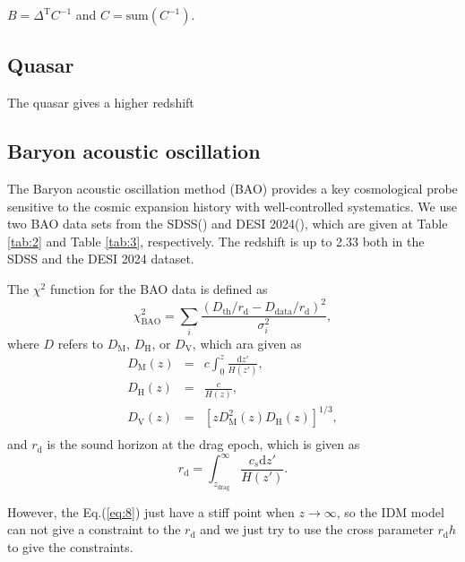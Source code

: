 \documentclass{aa}
\begin{document}
   $B=\Delta^{\text{T}}C^{-1}$ and $C=\text{sum}(C^{-1})$.

\subsection{Quasar}

   The quasar gives a higher redshift

\subsection{Baryon acoustic oscillation}

   The Baryon acoustic oscillation method (BAO) provides a key cosmological probe
   sensitive to the cosmic expansion history with well-controlled systematics.
   We use two BAO data sets from the SDSS(\cite{PhysRevD.103.083533}) and DESI 2024(\cite{desicollaboration2024desi2024vicosmological}),
   which are given at Table \ref{tab:2} and Table \ref{tab:3}, respectively.
   The redshift is up to 2.33 both in the SDSS and the DESI 2024 dataset.

   The $\chi^2$ function for the BAO data is defined as
   \begin{equation}
      \chi_{\text{BAO}}^2=\sum_i\frac{(D_{\text{th}}/r_{\text{d}}-D_{\text{data}}/r_{\text{d}})^2}{\sigma_i^2},
   \end{equation}
   where $D$ refers to $D_{\text{M}}$, $D_{\text{H}}$, or $D_{\text{V}}$, which ara given as
   \begin{eqnarray}
      D_{\text{M}}(z)&=&c\int_0^z\frac{\text{d}z'}{H(z')},\\
      D_{\text{H}}(z)&=&\frac{c}{H(z)},\\
      D_{\text{V}}(z)&=&\left[zD_{\text{M}}^2(z)D_{\text{H}}(z)\right]^{1/3},\\
   \end{eqnarray}
   and $r_{\text{d}}$ is the sound horizon at the drag epoch, which is given as
   \begin{equation}
      r_{\text{d}}=\int_{z_{\text{drag}}}^{\infty}\frac{c_s\text{d}z'}{H(z')}.
   \end{equation}

   However, the Eq.(\ref{eq:8}) just have a stiff point when $z\to\infty$, so the IDM
   model can not give a constraint to the $r_{\text{d}}$ and we just try to use the cross
   parameter $r_{\text{d}}h$ to give the constraints.
\end{document}
